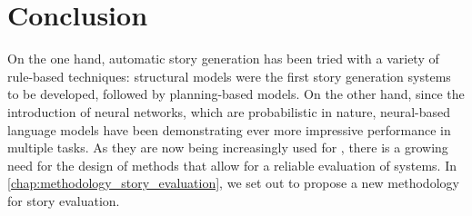 \section{Conclusion}

On the one hand, automatic story generation has been tried with a variety of rule-based techniques: structural models were the first story generation systems to be developed, followed by planning-based models. On the other hand, since the introduction of neural networks, which are probabilistic in nature, neural-based language models have been demonstrating ever more impressive performance in multiple {\nlp} tasks. As they are now being increasingly used for {\asgfull}, there is a growing need for the design of methods that allow for a reliable evaluation of {\asg} systems. In \autoref{chap:methodology_story_evaluation}, we set out to propose a new methodology for story evaluation.